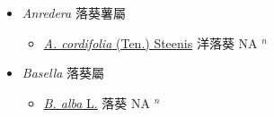 
  \begin{itemize}
 \item[] \textit{Anredera} 落葵薯屬
                    
  \begin{itemize}
        \item[] \href{http://www.theplantlist.org/tpl1.1/search?q=Anredera+cordifolia}{\textit{A. cordifolia} (Ten.) Steenis}   洋落葵 NA $^n$
  \end{itemize}
 \item[] \textit{Basella} 落葵屬
                    
  \begin{itemize}
        \item[] \href{http://www.theplantlist.org/tpl1.1/search?q=Basella+alba}{\textit{B. alba} L.}   落葵 NA $^n$
  \end{itemize}
  \end{itemize}
